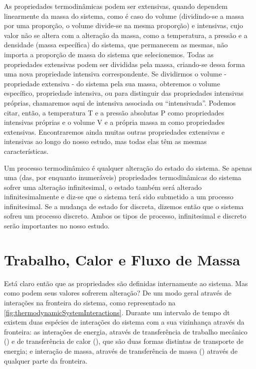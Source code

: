     As propriedades termodinâmicas podem ser extensivas, quando dependem
    linearmente da massa do sistema, como é caso do volume (dividindo-se a
    massa por uma proporção, o volume divide-se na mesma proporção) e
    intensivas, cujo valor não se altera com a alteração da massa, como a
    temperatura, a pressão e a densidade (massa específica) do sistema, que
    permanecem as mesmas, não importa a proporção de massa do sistema que
    selecionemos. Todas as propriedades extensivas podem ser divididas pela
    massa, criando-se dessa forma uma nova propriedade intensiva
    correspondente. Se dividirmos o volume - propriedade extensiva - do sistema
    pela sua massa, obteremos o volume específico, propriedade intensiva, ou
    para distinguir das propriedades intensivas próprias, chamaremos aqui de
    intensiva associada ou \enquote{intensivada}. Podemos citar, então, a
    temperatura T e a pressão absolutas P como propriedades intensivas próprias
    e o volume V e a própria massa m como propriedades extensivas.
    Encontraremos ainda muitas outras propriedades extensivas e intensivas ao
    longo do nosso estudo, mas todas elas têm as mesmas características.

    Um processo termodinâmico é qualquer alteração do estado do sistema. Se
    apenas uma (das, por enquanto inumeráveis) propriedades termodinâmicas do
    sistema sofrer uma alteração infinitesimal, o estado também será alterado
    infinitesimalmente e diz-se que o sistema terá sido submetido a um processo
    infinitesimal. Se a mudança de estado for discreta, dizemos então que o
    sistema sofreu um processo discreto. Ambos os tipos de processo,
    infinitesimal e discreto serão importantes no nosso estudo.

    \section{Trabalho, Calor e Fluxo de Massa}

    Está claro então que as propriedades são definidas internamente ao sistema.
    Mas como podem seus valores sofrerem alteração? De um modo geral através de
    interações na fronteira do sistema, como representado na
    \cref{fig:thermodynamicSystemInteractions}. Durante um intervalo de tempo
    dt  existem duas espécies de interações do sistema com a sua vizinhança
    através da fronteira: as interações de energia, através de transferência de
    trabalho mecânico () e de  transferência de calor
    (), que são duas formas distintas de transporte
    de energia; e interação de massa, através de transferência de massa
    () através de qualquer parte da fronteira.

